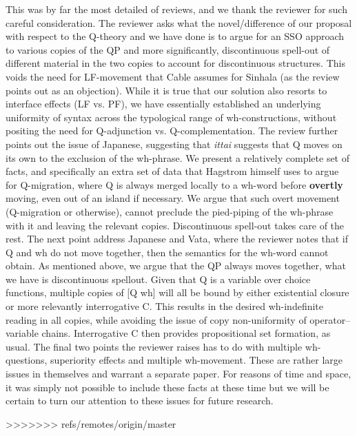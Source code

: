 \documentclass[11pt]{article}
\begin{document}
\maketitle
 This was by far the most detailed of reviews, and we thank the reviewer for such careful consideration. The reviewer asks what the novel/difference of our proposal with respect to the Q-theory and we have done is to argue for an SSO approach to various copies of the QP and more significantly, discontinuous spell-out of different material in the two copies to account for discontinuous structures. This voids the need for LF-movement that Cable assumes for Sinhala (as the review points out as an objection). While it is true that our solution also resorts to interface effects (LF vs. PF), we have essentially established an underlying uniformity of syntax across the typological range of wh-constructions, without positing the need for Q-adjunction vs. Q-complementation. The review further points out the issue of Japanese, suggesting that \textit{ittai} suggests that Q moves on its own to the exclusion of the wh-phrase. We present a relatively complete set of facts, and specifically an extra set of data that Hagstrom himself uses to argue for Q-migration, where Q is always merged locally to a wh-word before \textbf{overtly} moving, even out of an island if necessary. We argue that such overt movement (Q-migration or otherwise), cannot preclude the pied-piping of the wh-phrase with it and leaving the relevant copies. Discontinuous spell-out takes care of the rest. The next point address Japanese and Vata, where the reviewer notes that if Q and wh do not move together, then the semantics for the wh-word cannot obtain. As mentioned above, we argue that the QP always moves together, what we have is discontinuous spellout. Given that Q is a variable over choice functions, multiple copies of [Q wh] will all be bound by either existential closure or more relevantly interrogative C. This results in the desired wh-indefinite reading in all copies, while avoiding the issue of copy non-uniformity of operator--variable chains. Interrogative C then provides propositional set formation, as usual. The final two points the reviewer raises has to do with multiple wh-questions, superiority effects and multiple wh-movement. These are rather large issues in themselves and warrant a separate paper. For reasons of time and space, it was simply not possible to include these facts at these time but we will be certain to turn our attention to these issues for future research.


>>>>>>> refs/remotes/origin/master
\end{document}
